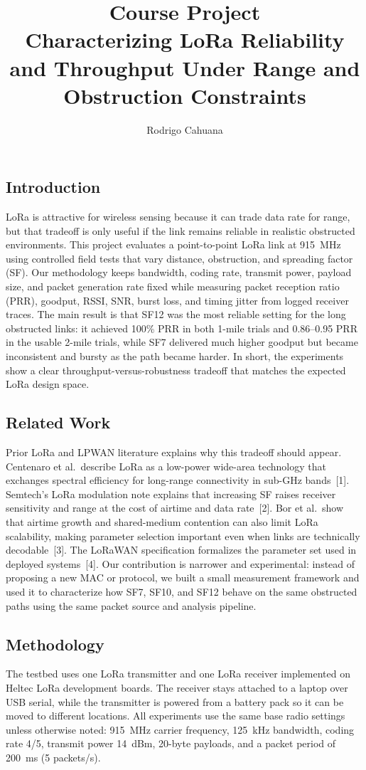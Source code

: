 \documentclass[letterpaper,twocolumn,10pt]{article}
\title{Course Project\\
Characterizing LoRa Reliability and Throughput Under Range and Obstruction Constraints}
\author{Rodrigo Cahuana}
\begin{document}
\maketitle

\subsection*{Introduction}
LoRa is attractive for wireless sensing because it can trade data rate for range, but that tradeoff is only useful if the link remains reliable in realistic obstructed environments. This project evaluates a point-to-point LoRa link at 915~MHz using controlled field tests that vary distance, obstruction, and spreading factor (SF). Our methodology keeps bandwidth, coding rate, transmit power, payload size, and packet generation rate fixed while measuring packet reception ratio (PRR), goodput, RSSI, SNR, burst loss, and timing jitter from logged receiver traces. The main result is that SF12 was the most reliable setting for the long obstructed links: it achieved 100\% PRR in both 1-mile trials and 0.86--0.95 PRR in the usable 2-mile trials, while SF7 delivered much higher goodput but became inconsistent and bursty as the path became harder. In short, the experiments show a clear throughput-versus-robustness tradeoff that matches the expected LoRa design space.

\subsection*{Related Work}
Prior LoRa and LPWAN literature explains why this tradeoff should appear. Centenaro et al.\ describe LoRa as a low-power wide-area technology that exchanges spectral efficiency for long-range connectivity in sub-GHz bands~[1]. Semtech's LoRa modulation note explains that increasing SF raises receiver sensitivity and range at the cost of airtime and data rate~[2]. Bor et al.\ show that airtime growth and shared-medium contention can also limit LoRa scalability, making parameter selection important even when links are technically decodable~[3]. The LoRaWAN specification formalizes the parameter set used in deployed systems~[4]. Our contribution is narrower and experimental: instead of proposing a new MAC or protocol, we built a small measurement framework and used it to characterize how SF7, SF10, and SF12 behave on the same obstructed paths using the same packet source and analysis pipeline.

\subsection*{Methodology}
The testbed uses one LoRa transmitter and one LoRa receiver implemented on Heltec LoRa development boards. The receiver stays attached to a laptop over USB serial, while the transmitter is powered from a battery pack so it can be moved to different locations. All experiments use the same base radio settings unless otherwise noted: 915~MHz carrier frequency, 125~kHz bandwidth, coding rate 4/5, transmit power 14~dBm, 20-byte payloads, and a packet period of 200~ms (5 packets/s).
\end{document}
